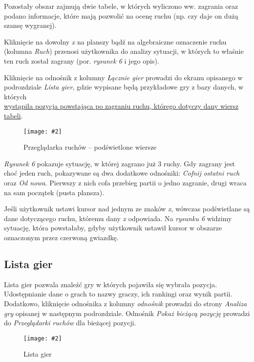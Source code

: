 \documentclass[10pt,leqno]{article}
\newcommand{\myimage}[3]{
  \begin{figure}[h!]
    \centering
      \texttt{[image: \#2]}
  \caption{#3}
  \end{figure}
}
\begin{document}
\vspace{0.5em}

\noindent Pozostały obszar zajmują dwie tabele, w których wyliczono ww. zagrania oraz podano informacje, które mają pozwolić na ocenę
ruchu (np. czy daje on dużą szansę wygranej).

\vspace{0.5em}

\noindent Kliknięcie na dowolny \emph{x} na planszy bądź na algebraiczne oznaczenie ruchu (kolumna \emph{Ruch}) przenosi użytkownika do
analizy sytuacji, w których to właśnie ten ruch został zagrany (por. \emph{rysunek 6} i jego opis).

\vspace{0.5em}

\noindent Kliknięcie na odnośnik z kolumny \emph{Łącznie gier} prowadzi do ekranu opisanego w podrozdziale \emph{Lista gier}, 
gdzie wypisane będą przykładowe gry z bazy danych, w których \\ 
\underline{wystąpiła pozycja powstająca po zagraniu ruchu, którego dotyczy dany wiersz tabeli}.

\myimage{0.47}{moveBrowserMoveOver.png}{Przeglądarka ruchów -- podświetlone wiersze}

\emph{Rysunek 6} pokazuje sytuację, w której zagrano już 3 ruchy. Gdy zagrany jest choć jeden ruch, pokazywane są dwa dodatkowe odnośniki:
\emph{Cofnij ostatni ruch} oraz \emph{Od nowa}. Pierwszy z nich cofa przebieg partii o jedno zagranie, drugi wraca na sam początek (pusta plansza).

Jeśli użytkownik ustawi kursor nad jednym ze znaków \emph{x}, wówczas podświetlane są dane dotyczącego ruchu, któremu dany \emph{x} odpowiada.
Na \emph{rysunku 6} widzimy sytuację, która powstałaby, gdyby użytkownik ustawił kursor w obszarze oznaczonym przez czerwoną gwiazdkę.

\newpage

\subsection{Lista gier}
Lista gier pozwala znaleźć gry w których pojawiła się wybrała pozycja. Udostępnianie dane o grach to nazwy graczy, ich rankingi oraz wynik partii.
Dodatkowo, kliknięcie odnośnika z kolumny \emph{odnośnik} prowadzi do strony \emph{Analiza gry} opisanej w następnym podrozdziale. Odnośnik 
\emph{Pokaż bieżącą pozycję} prowadzi do \emph{Przeglądarki ruchów} dla bieżącej pozycji.

\myimage{0.47}{gameList.png}{Lista gier}
\end{document}
